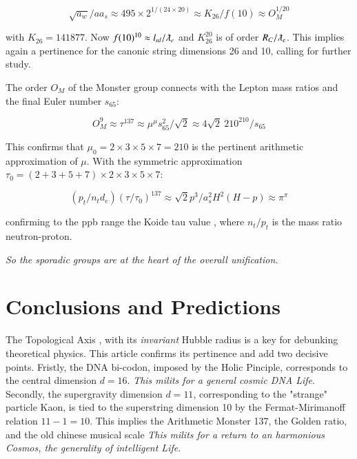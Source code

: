 \documentclass[a4paper,9pt]{article}
\begin{document}
\begin{equation}\label{Eq52}
 \sqrt {a_w}/aa_s \approx 495 \times 2^{1/(24\times20)} \approx K_{26}/f(10) \approx O_M^{1/20}    
 \end{equation}

 with $K_{26} = 141877$. Now $f(10)^{10} \approx l_{nl}/\lambdabar_e$ and $K_{26}^{20}$ is of order $R_C/\lambdabar_e$. This implies again a pertinence for the canonic string dimensions 26 and 10, calling for further study.
 
 The order $O_M$ of the Monster group connects with the Lepton mass ratios and the final Euler number $s_{65}$:
 
 \begin{equation}\label{Eq53}
 O_M^9 \approx \tau^{137} \approx \mu^\mu s_{65}^2/\sqrt2 \approx 4 \sqrt2 ~210^{210}/s_{65}     
 \end{equation}
 
This confirms that $\mu_0 = 2\times 3\times 5\times 7 = 210$ is the pertinent arithmetic approximation of $\mu$. With the symmetric approximation $\tau_0 = (2+3+5+7) \times 2\times 3\times 5\times 7 $: 
 
\begin{equation}\label{Eq54}
 (p_t/n_td_e)(\tau/\tau_0 )^{137} \approx \sqrt2 p^3/a_s^2H^2(H-p) \approx \pi^{\pi}  
 \end{equation}

confirming to the ppb range the Koide tau value \cite{Koide}, where $n_t/p_t$ is the mass ratio neutron-proton.

\textit{So the sporadic groups are at the heart of the overall unification.}
 
 
  
 
\section{Conclusions and Predictions}

The Topological Axis \cite{Sanchez2}, with its \textit{invariant} Hubble radius is a key for debunking theoretical physics. This article confirms its pertinence and add two decisive points. Fristly, the DNA bi-codon, imposed by the Holic Pinciple, corresponds to the central dimension $d = 16$. \textit{This milits for a general cosmic DNA Life}. Secondly, the supergravity dimension $d = 11$, corresponding to the "strange" particle Kaon, is tied to the superstring dimension 10 by the Fermat-Mirimanoff relation $11 - 1 = 10$. This implies the Arithmetic Monster 137, the Golden ratio, and the old chinese musical scale \textit{This milits for a return to an harmonious Cosmos, the generality of intelligent Life}\cite{Sanchez1}.
\end{document}
